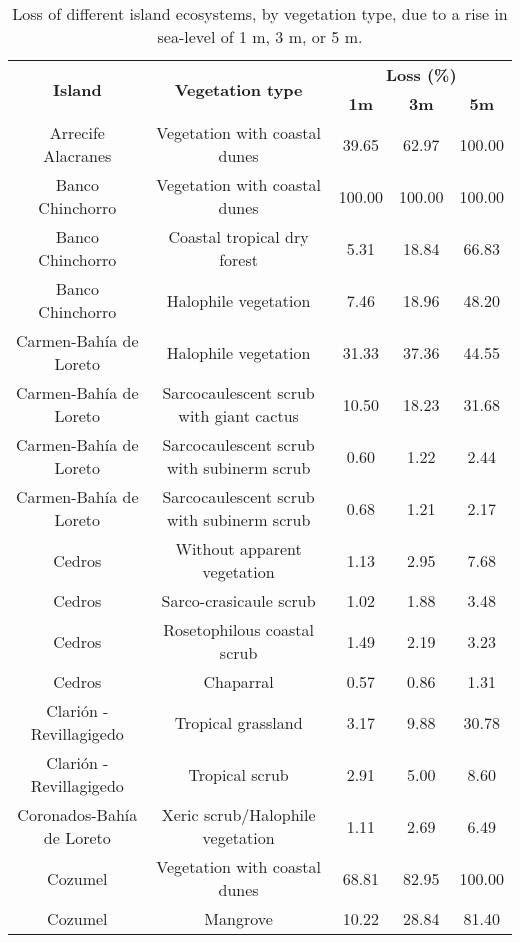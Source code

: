 \documentclass{article} %
\begin{document}
\begin{table}
\caption{Loss of different island ecosystems, by vegetation type, due to a rise in
sea-level of 1 m, 3 m, or 5 m.}
\vspace{2mm}
\begin{adjustwidth}{-0.5cm}{}
\setlength{\tabcolsep}{4pt}
\begin{tabular}{ccccc}
\hline
\multirow{2}{*}{\textbf{Island}}  & \multirow{2}{*}{\textbf{Vegetation type}} & \multicolumn{3}{c}{\textbf{Loss (\%)}}  \\
 & & \textbf{1m} & \textbf{3m} & \textbf{5m} \\
 
\hline
Arrecife Alacranes & Vegetation with coastal dunes & 39.65 & 62.97 & 100.00 \\
Banco Chinchorro &    Vegetation with coastal dunes & 100.00 & 100.00 & 100.00 \\
Banco Chinchorro &     Coastal tropical dry forest & 5.31 & 18.84 & 66.83 \\
Banco Chinchorro &      Halophile vegetation & 7.46 & 18.96 & 48.20 \\
Carmen-Bahía de Loreto &       Halophile vegetation & 31.33 & 37.36 & 44.55 \\
Carmen-Bahía de Loreto &  Sarcocaulescent scrub with giant cactus & 10.50 & 18.23 & 31.68 \\
Carmen-Bahía de Loreto & Sarcocaulescent scrub with subinerm scrub & 0.60 & 1.22 &  2.44 \\
Carmen-Bahía de Loreto & Sarcocaulescent scrub with subinerm scrub & 0.68 & 1.21 &  2.17 \\
Cedros &     Without apparent vegetation & 1.13 & 2.95 &  7.68 \\
Cedros &      Sarco-crasicaule scrub & 1.02 & 1.88 &  3.48 \\
Cedros &     Rosetophilous coastal scrub & 1.49 & 2.19 &  3.23 \\
Cedros &         Chaparral & 0.57 & 0.86 &  1.31 \\
Clarión -Revillagigedo &       Tropical grassland & 3.17 & 9.88 & 30.78 \\
Clarión -Revillagigedo &        Tropical scrub & 2.91 & 5.00 &  8.60 \\
Coronados-Bahía de Loreto &    Xeric scrub/Halophile vegetation & 1.11 & 2.69 &  6.49 \\
Cozumel &    Vegetation with coastal dunes & 68.81 & 82.95 & 100.00 \\
Cozumel &         Mangrove & 10.22 & 28.84 & 81.40 \\

\end{tabular}
\end{adjustwidth}
\end{table}
\end{document}
